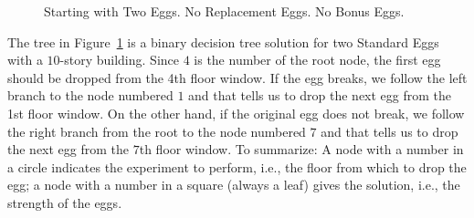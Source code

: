 \documentclass[12pt]{amsart}
\theoremstyle{definition}
\theoremstyle{theorem}
\begin{document}
\begin{figure}[htp]\centering    %

\medskip
\caption{Starting with Two Eggs. No Replacement Eggs. No Bonus Eggs.} \label{eight.two}
\end{figure}

The tree in Figure~\ref{eight.two} is a binary decision tree solution for two Standard Eggs 
with a $10$-story building. Since $4$ is the number of the root node,  the first egg should be dropped from the 4th floor window. If the egg breaks, we follow the left branch to the node numbered $1$ and that tells us to drop the next egg from the 1st floor window. On the other hand, if the original egg does not break, we follow the right branch from the root to the node numbered $7$ and that tells us to drop the next egg from the $7$th floor window. To summarize:
A node with a number in a circle  
indicates the experiment to perform, i.e., the floor from which to drop the egg; a node with a number in 
a square (always a leaf)  gives the solution, i.e., the strength of the eggs. 
\end{document}
